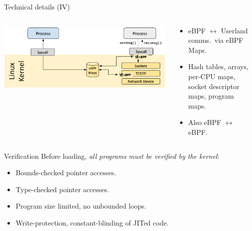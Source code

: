 \documentclass[aspectratio=169,xcolor={dvipsnames}
,handout %
]{beamer}
\begin{document}
\begin{frame}{Technical details (IV)}
	\begin{columns}
		\begin{column}{0.5\linewidth}
			\includegraphics[keepaspectratio,max width=0.9\linewidth]{images/map-architecture}
		\end{column}
		\begin{column}{0.4\linewidth}
			\begin{itemize}[<+->]
				\item eBPF $\leftrightarrow$ Userland comms.\ via eBPF Maps.
				\item Hash tables, arrays, per-CPU maps, socket descriptor maps, \alert{program maps}.
				\item Also eBPF $\leftrightarrow$ eBPF.
			\end{itemize}
		\end{column}
	\end{columns}
\end{frame}

\begin{frame}{Verification}
	Before loading, \emph{all programs must be verified by the kernel}:
	\begin{itemize}[<+->]
		\item Bounds-checked pointer accesses.
		\item Type-checked pointer accesses.
		\item \alert{Program size limited, no unbounded loops}.
		\item Write-protection, constant-blinding of JITed code.
	\end{itemize}
\end{frame}
\end{document}
